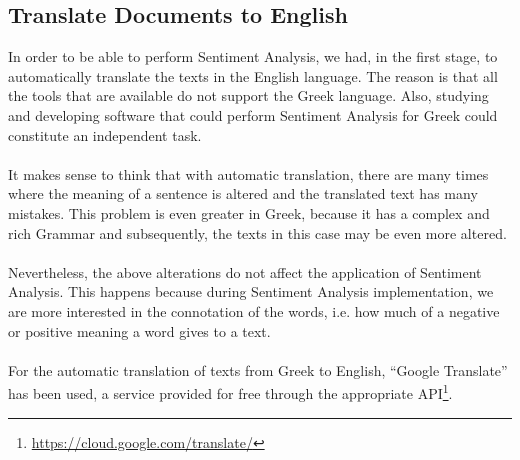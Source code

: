 \subsection{Translate Documents to English}\label{341_ref}
In order to be able to perform Sentiment Analysis, we had, in the first stage, to automatically translate the texts in the English language. The reason is that all the tools that are available do not support the Greek language. Also, studying and developing software that could perform Sentiment Analysis for Greek could constitute an independent task.\\
\\
It makes sense to think that with automatic translation, there are many times where the meaning of a sentence is altered and the translated text has many mistakes. This problem is even greater in Greek, because it has a complex and rich Grammar and subsequently, the texts in this case may be even more altered.\\
\\
Nevertheless, the above alterations do not affect the application of Sentiment Analysis. This happens because during Sentiment Analysis implementation, we are more interested in the connotation of the words, i.e. how much of a negative or positive meaning a word gives to a text.\\
\\
For the automatic translation of texts  from Greek to English, ``Google Translate'' has been used, a service provided for free through the appropriate API\footnote{\url{https://cloud.google.com/translate/}}.
